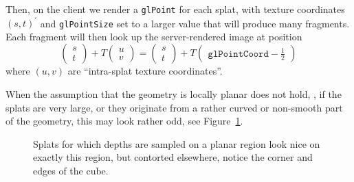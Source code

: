 Then, on the client we render a \texttt{glPoint} for each splat, with texture
coordinates $(s, t)^\prime$ and \texttt{glPointSize} set to a larger value that will
produce many fragments. Each fragment will then look up the server-rendered
image at position
\[
  \begin{pmatrix}
    s \\ t
  \end{pmatrix} +
  T 
  \begin{pmatrix}
    u \\ v
  \end{pmatrix}
  =
  \begin{pmatrix}
    s \\ t
  \end{pmatrix} +
  T 
  \begin{pmatrix}
    \texttt{glPointCoord}-\frac{1}{2}
  \end{pmatrix}
\]
where $(u, v)$ are ``intra-splat texture coordinates''.

When the assumption that the geometry is locally planar does not hold, \eg, if
the splats are very large, or they originate from a rather curved or non-smooth
part of the geometry, this may look rather odd, see
Figure~\ref{fig:LargeSplatsOnCorners}.

\begin{figure}[htb]
  \centering
  \caption{\label{fig:LargeSplatsOnCorners}
           Splats for which depths are sampled on a planar region look nice on
  exactly this region, but contorted elsewhere, notice the corner and edges of
  the cube.}
\end{figure}

